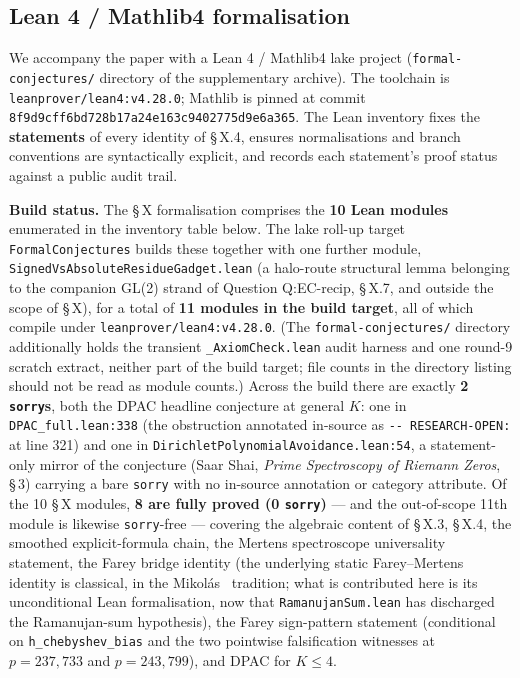 \subsection{Lean 4 / Mathlib4 formalisation}

We accompany the paper with a Lean 4 / Mathlib4 lake project
(\texttt{formal-conjectures/} directory of the supplementary archive).
The toolchain is \texttt{leanprover/lean4:v4.28.0}; Mathlib is pinned at
commit \texttt{8f9d9cff6bd728b17a24e163c9402775d9e6a365}. The Lean
inventory fixes
the \textbf{statements} of every identity of \S\,X.4, ensures normalisations
and branch conventions are syntactically explicit, and records each
statement's proof status against a public audit trail.

\textbf{Build status.} The \S\,X formalisation comprises the \textbf{10 Lean
modules} enumerated in the inventory table below. The lake
roll-up target \texttt{FormalConjectures} builds these together with one
further module, \texttt{SignedVsAbsoluteResidueGadget.lean} (a halo-route
structural lemma belonging to the companion GL(2) strand of
Question Q:EC-recip, \S\,X.7, and outside the scope of \S\,X), for a
total of \textbf{11 modules in the build target}, all of which compile
under \texttt{leanprover/lean4:v4.28.0}. (The \texttt{formal-conjectures/}
directory additionally holds the transient \texttt{\_AxiomCheck.lean}
audit harness and one round-9 scratch extract, neither part of the
build target; file counts in the directory listing should not be
read as module counts.) Across the build there are exactly
\textbf{2 \texttt{sorry}s}, both the DPAC headline conjecture at general \(K\):
one in \texttt{DPAC\_full.lean:338} (the obstruction annotated in-source
as \texttt{-\/-\ RESEARCH-OPEN:} at line 321) and one in
\texttt{DirichletPolynomialAvoidance.lean:54}, a statement-only mirror of
the conjecture (Saar Shai, \emph{Prime Spectroscopy of Riemann Zeros},
\S\,3) carrying a bare \texttt{sorry} with no in-source annotation or
category attribute. Of the 10 \S\,X modules, \textbf{8 are fully proved
(0 \texttt{sorry})} --- and the out-of-scope 11th module is likewise
\texttt{sorry}-free --- covering the algebraic content of \S\,X.3, \S\,X.4, the
smoothed explicit-formula chain, the Mertens spectroscope
universality statement, the Farey bridge identity (the
underlying static Farey--Mertens identity is classical, in the
Mikol\'as~\cite{Mikolas1949} tradition; what is contributed here is its
unconditional Lean formalisation, now that \texttt{RamanujanSum.lean}
has discharged the Ramanujan-sum hypothesis), the Farey
sign-pattern statement
(conditional on \texttt{h\_chebyshev\_bias} and the two pointwise
falsification witnesses at \(p = 237{,}733\) and \(p = 243{,}799\)),
and DPAC for \(K \le 4\).

